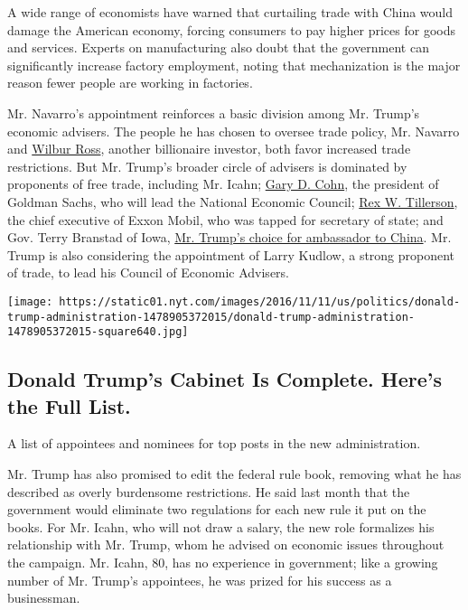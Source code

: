 A wide range of economists have warned that curtailing trade with China
would damage the American economy, forcing consumers to pay higher
prices for goods and services. Experts on manufacturing also doubt that
the government can significantly increase factory employment, noting
that mechanization is the major reason fewer people are working in
factories.

Mr. Navarro's appointment reinforces a basic division among Mr. Trump's
economic advisers. The people he has chosen to oversee trade policy, Mr.
Navarro and
\href{https://www.nytimes.com/2016/11/24/us/politics/wilbur-ross-commerce-trump.html}{Wilbur
Ross}, another billionaire investor, both favor increased trade
restrictions. But Mr. Trump's broader circle of advisers is dominated by
proponents of free trade, including Mr. Icahn;
\href{https://www.nytimes.com/2016/12/12/business/dealbook/goldman-sachs-gary-cohn.html}{Gary
D. Cohn}, the president of Goldman Sachs, who will lead the National
Economic Council;
\href{https://www.nytimes.com/2016/12/12/us/politics/rex-tillerson-secretary-of-state-trump.html}{Rex
W. Tillerson}, the chief executive of Exxon Mobil, who was tapped for
secretary of state; and Gov. Terry Branstad of Iowa,
\href{http://www.nytimes.com/2016/12/07/us/politics/terry-branstad-china-ambassador-trump.html?_r=0}{Mr.
Trump's choice for ambassador to China}. Mr. Trump is also considering
the appointment of Larry Kudlow, a strong proponent of trade, to lead
his Council of Economic Advisers.

\href{https://www.nytimes.com/interactive/2016/us/politics/donald-trump-administration.html}{}

\texttt{[image: https://static01.nyt.com/images/2016/11/11/us/politics/donald-trump-administration-1478905372015/donald-trump-administration-1478905372015-square640.jpg]}

\hypertarget{donald-trumps-cabinet-is-complete-heres-the-full-list}{%
\subsection{Donald Trump's Cabinet Is Complete. Here's the Full
List.}\label{donald-trumps-cabinet-is-complete-heres-the-full-list}}

A list of appointees and nominees for top posts in the new
administration.

Mr. Trump has also promised to edit the federal rule book, removing what
he has described as overly burdensome restrictions. He said last month
that the government would eliminate two regulations for each new rule it
put on the books. For Mr. Icahn, who will not draw a salary, the new
role formalizes his relationship with Mr. Trump, whom he advised on
economic issues throughout the campaign. Mr. Icahn, 80, has no
experience in government; like a growing number of Mr. Trump's
appointees, he was prized for his success as a businessman.

